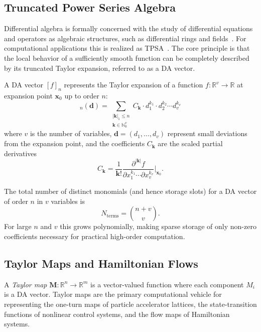 \documentclass[aps,prb,reprint,superscriptaddress,nofootinbib]{revtex4-2}
\begin{document}
\subsection{Truncated Power Series Algebra}

Differential algebra is formally concerned with the study of differential equations and operators as algebraic structures, such as differential rings and fields~\cite{ritt1950differential}. For computational applications this is realized as TPSA~\cite{berz1999differential}. The core principle is that the local behavior of a sufficiently smooth function can be completely described by its truncated Taylor expansion, referred to as a DA vector.

A DA vector $[f]_n$ represents the Taylor expansion of a function $f:\mathbb{R}^v \to \mathbb{R}$ at expansion point $\mathbf{x}_0$ up to order $n$:
\begin{equation}
    [f]_n(\mathbf{d}) = \sum_{\substack{|\mathbf{k}|_1 \leq n \\ \mathbf{k} \in \mathbb{N}_0^v}} C_{\mathbf{k}} \cdot d_1^{k_1} \cdot d_2^{k_2} \cdots d_v^{k_v}
\end{equation}
where $v$ is the number of variables, $\mathbf{d} = (d_1,\ldots,d_v)$ represent small deviations from the expansion point, and the coefficients $C_{\mathbf{k}}$ are the scaled partial derivatives
\begin{equation}
    C_{\mathbf{k}} = \frac{1}{\mathbf{k}!} \frac{\partial^{|\mathbf{k}|} f}{\partial x_1^{k_1} \cdots \partial x_v^{k_v}}\bigg|_{\mathbf{x}_0}.
\end{equation}

The total number of distinct monomials (and hence storage slots) for a DA vector of order $n$ in $v$ variables is
\begin{equation}
    N_{\text{terms}} = \binom{n+v}{v}.
\end{equation}
For large $n$ and $v$ this grows polynomially, making sparse storage of only non-zero coefficients necessary for practical high-order computation.

\subsection{Taylor Maps and Hamiltonian Flows}

A \emph{Taylor map} $\mathbf{M}: \mathbb{R}^n \to \mathbb{R}^m$ is a vector-valued function where each component $M_i$ is a DA vector. Taylor maps are the primary computational vehicle for representing the one-turn maps of particle accelerator lattices, the state-transition functions of nonlinear control systems, and the flow maps of Hamiltonian systems.
\end{document}
